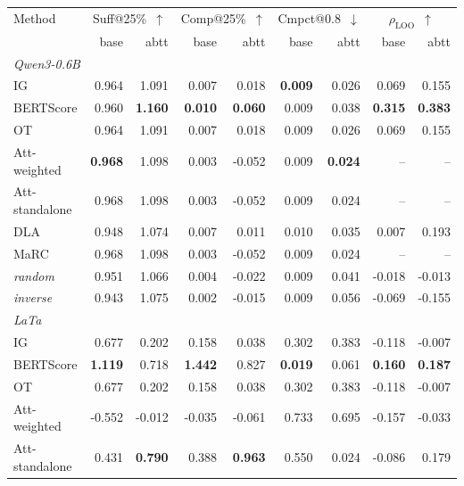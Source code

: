 \begin{table}[t]
\centering
\footnotesize
\setlength{\tabcolsep}{3pt}
\begin{tabular}{lrrrrrrrr}
\toprule
Method & \multicolumn{2}{c}{Suff@25\%~$\uparrow$} & \multicolumn{2}{c}{Comp@25\%~$\uparrow$} & \multicolumn{2}{c}{Cmpct@0.8~$\downarrow$} & \multicolumn{2}{c}{$\rho_{\text{LOO}}$~$\uparrow$} \\
\cmidrule(lr){2-3} \cmidrule(lr){4-5} \cmidrule(lr){6-7} \cmidrule(lr){8-9}
 & base & abtt & base & abtt & base & abtt & base & abtt \\
\midrule
\multicolumn{9}{l}{\textit{Qwen3-0.6B}} \\
IG & 0.964 & 1.091 & 0.007 & 0.018 & \textbf{0.009} & 0.026 & 0.069 & 0.155 \\
BERTScore & 0.960 & \textbf{1.160} & \textbf{0.010} & \textbf{0.060} & 0.009 & 0.038 & \textbf{0.315} & \textbf{0.383} \\
OT & 0.964 & 1.091 & 0.007 & 0.018 & 0.009 & 0.026 & 0.069 & 0.155 \\
Att-weighted & \textbf{0.968} & 1.098 & 0.003 & -0.052 & 0.009 & \textbf{0.024} & -- & -- \\
Att-standalone & 0.968 & 1.098 & 0.003 & -0.052 & 0.009 & 0.024 & -- & -- \\
DLA & 0.948 & 1.074 & 0.007 & 0.011 & 0.010 & 0.035 & 0.007 & 0.193 \\
MaRC & 0.968 & 1.098 & 0.003 & -0.052 & 0.009 & 0.024 & -- & -- \\
\textit{random} & 0.951 & 1.066 & 0.004 & -0.022 & 0.009 & 0.041 & -0.018 & -0.013 \\
\textit{inverse} & 0.943 & 1.075 & 0.002 & -0.015 & 0.009 & 0.056 & -0.069 & -0.155 \\
\midrule
\multicolumn{9}{l}{\textit{LaTa}} \\
IG & 0.677 & 0.202 & 0.158 & 0.038 & 0.302 & 0.383 & -0.118 & -0.007 \\
BERTScore & \textbf{1.119} & 0.718 & \textbf{1.442} & 0.827 & \textbf{0.019} & 0.061 & \textbf{0.160} & \textbf{0.187} \\
OT & 0.677 & 0.202 & 0.158 & 0.038 & 0.302 & 0.383 & -0.118 & -0.007 \\
Att-weighted & -0.552 & -0.012 & -0.035 & -0.061 & 0.733 & 0.695 & -0.157 & -0.033 \\
Att-standalone & 0.431 & \textbf{0.790} & 0.388 & \textbf{0.963} & 0.550 & 0.024 & -0.086 & 0.179 \\

\end{tabular}
\end{table}
